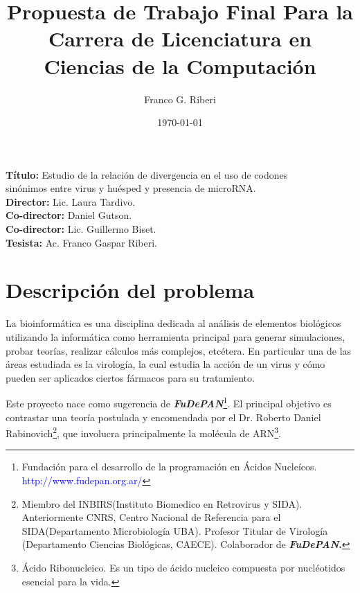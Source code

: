 \documentclass[12pt,a4paper]{article}
\begin{document}
 

\title{Propuesta de Trabajo Final Para la Carrera de Licenciatura en Ciencias de la Computación}
		\vskip 2cm
\author{Franco G. Riberi}
		\vskip 2cm
\date{\today} 	

\maketitle

\noindent \textbf{Título:} Estudio de la relación de divergencia en el uso de codones \\
sinónimos entre virus y huésped y presencia de microRNA. \\
\vskip 0.01cm
\noindent \textbf{Director:} Lic. Laura Tardivo.\\ 
\vskip 0.01cm
\noindent \textbf{Co-director:}  Daniel Gutson.\\
\vskip 0.01cm
\noindent \textbf{Co-director:} Lic. Guillermo Biset.\\
\vskip 0.01cm
\noindent \textbf{Tesista:} Ac. Franco Gaspar Riberi. \\

\section{Descripción del problema}

\par La bioinformática es una disciplina dedicada al análisis de elementos biológicos utilizando la
informática como herramienta principal para generar simulaciones, probar teorías,  realizar cálculos más complejos, etcétera. En particular una de las áreas estudiada es la virología, la cual estudia la acción de un virus y cómo pueden ser aplicados ciertos fármacos para su tratamiento. 

\par Este proyecto nace como sugerencia de \textbf{\textit{FuDePAN}}\footnote{Fundación para el desarrollo de la programación en Ácidos Nucleícos. \textcolor{blue}{http://www.fudepan.org.ar/}}. El principal objetivo es contrastar una teoría postulada y encomendada por el Dr. Roberto Daniel Rabinovich\footnote{Miembro del INBIRS(Instituto Biomedico en Retrovirus y SIDA). Anteriormente CNRS, Centro Nacional de Referencia para el SIDA(Departamento Microbiología UBA). Profesor Titular de Virología (Departamento Ciencias Biológicas, CAECE). Colaborador de \textbf{\textit{FuDePAN}.}}, que involucra principalmente la molécula de ARN\footnote{Ácido Ribonucleico. Es un tipo de ácido nucleico compuesta por nucléotidos esencial para la vida.}.
\end{document}
